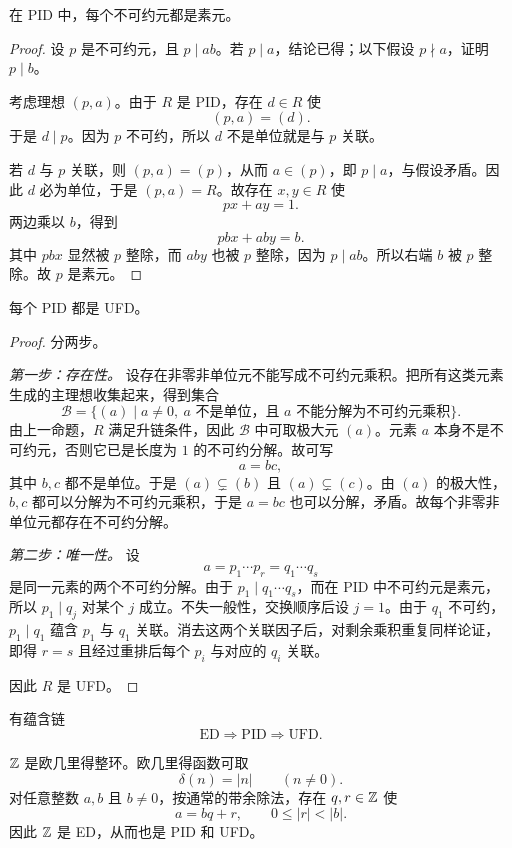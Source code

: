 \begin{lemma}
在 PID 中，每个不可约元都是素元。
\end{lemma}

\begin{proof}
设 $p$ 是不可约元，且 $p\mid ab$。若 $p\mid a$，结论已得；以下假设 $p\nmid a$，证明 $p\mid b$。

考虑理想 $(p,a)$。由于 $R$ 是 PID，存在 $d\in R$ 使
\[
(p,a)=(d).
\]
于是 $d\mid p$。因为 $p$ 不可约，所以 $d$ 不是单位就是与 $p$ 关联。

若 $d$ 与 $p$ 关联，则 $(p,a)=(p)$，从而 $a\in (p)$，即 $p\mid a$，与假设矛盾。因此 $d$ 必为单位，于是 $(p,a)=R$。故存在 $x,y\in R$ 使
\[
px+ay=1.
\]
两边乘以 $b$，得到
\[
pbx+aby=b.
\]
其中 $pbx$ 显然被 $p$ 整除，而 $aby$ 也被 $p$ 整除，因为 $p\mid ab$。所以右端 $b$ 被 $p$ 整除。故 $p$ 是素元。
\end{proof}

\begin{theorem}
每个 PID 都是 UFD。
\end{theorem}

\begin{proof}
分两步。

\emph{第一步：存在性。} 设存在非零非单位元不能写成不可约元乘积。把所有这类元素生成的主理想收集起来，得到集合
\[
\mathcal{B}=\{(a)\mid a\neq 0,\ a\text{ 不是单位，且 }a\text{ 不能分解为不可约元乘积}\}.
\]
由上一命题，$R$ 满足升链条件，因此 $\mathcal{B}$ 中可取极大元 $(a)$。元素 $a$ 本身不是不可约元，否则它已是长度为 $1$ 的不可约分解。故可写
\[
a=bc,
\]
其中 $b,c$ 都不是单位。于是 $(a)\subsetneq (b)$ 且 $(a)\subsetneq (c)$。由 $(a)$ 的极大性，$b,c$ 都可以分解为不可约元乘积，于是 $a=bc$ 也可以分解，矛盾。故每个非零非单位元都存在不可约分解。

\emph{第二步：唯一性。} 设
\[
a=p_1\cdots p_r=q_1\cdots q_s
\]
是同一元素的两个不可约分解。由于 $p_1\mid q_1\cdots q_s$，而在 PID 中不可约元是素元，所以 $p_1\mid q_j$ 对某个 $j$ 成立。不失一般性，交换顺序后设 $j=1$。由于 $q_1$ 不可约，$p_1\mid q_1$ 蕴含 $p_1$ 与 $q_1$ 关联。消去这两个关联因子后，对剩余乘积重复同样论证，即得 $r=s$ 且经过重排后每个 $p_i$ 与对应的 $q_i$ 关联。

因此 $R$ 是 UFD。
\end{proof}

\begin{corollary}
有蕴含链
\[
\text{ED} \Longrightarrow \text{PID} \Longrightarrow \text{UFD}.
\]
\end{corollary}

\begin{example}
$\mathbb{Z}$ 是欧几里得整环。欧几里得函数可取
\[
\delta(n)=|n|\qquad (n\neq 0).
\]
对任意整数 $a,b$ 且 $b\neq 0$，按通常的带余除法，存在 $q,r\in\mathbb{Z}$ 使
\[
a=bq+r,
\qquad 0\le |r|<|b|.
\]
因此 $\mathbb{Z}$ 是 ED，从而也是 PID 和 UFD。
\end{example}

